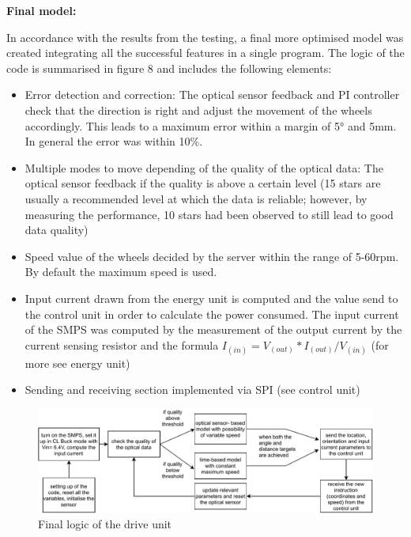 \documentclass[10pt,twoside]{article}
\begin{document}
\textbf{Final model:}

In accordance with the results from the testing, a final more optimised model was created integrating all the successful features in a single program.
The logic of the code is summarised in figure 8 and includes the following elements:
\begin{itemize}
\item 	Error detection and correction: The optical sensor feedback and PI controller check that the direction is right and adjust the movement of the wheels accordingly. This leads to a maximum error within a margin of 5° and 5mm. In general the error was within 10\%.
\item 	Multiple modes to move depending of the quality of the optical data: The optical sensor feedback if the quality is above a certain level (15 stars are usually a recommended level at which the data is reliable; however, by measuring the performance, 10 stars had been observed to still lead to good data quality)
\item 	Speed value of the wheels decided by the server within the range of 5-60rpm. By default the maximum speed is used.
\item 	Input current drawn from the energy unit is computed and the value send to the control unit in order to calculate the power consumed. The input current of the SMPS was computed by the measurement of the output current by the current sensing resistor and the formula $I_(in) = V_(out)*I_(out)/V_(in)$ (for more see energy unit)

\item 	Sending and receiving section implemented via SPI (see control unit)
\end{itemize}

\begin{figure}[hbt]
    \centering
    \includegraphics[width = \textwidth]{driveunit_structure.pdf}
    \caption{Final logic of the drive unit}
    \label{figure}
\end{figure}
\end{document}
